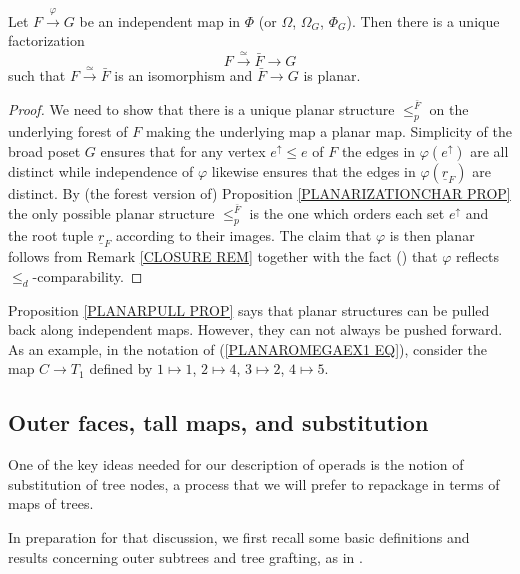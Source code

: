 \documentclass[a4paper,10pt]{article}%
\begin{document}
\begin{proposition}
\label{PLANARPULL PROP}
	Let $F \xrightarrow{\varphi} G$ be an independent map in $\Phi$ (or $\Omega$, $\Omega_G$, $\Phi_G$). Then there is a unique factorization 
	\[F \xrightarrow{\simeq} \bar{F} \to G\]
	such that $F \xrightarrow{\simeq} \bar{F}$ is an isomorphism and $\bar{F} \to G$ is planar.
\end{proposition}

\begin{proof}
We need to show that there is a unique planar structure 
$\leq_p^{\bar{F}}$ on the underlying forest of $F$ making the underlying map a planar map.
Simplicity of the broad poset $G$ ensures that for any vertex $e^{\uparrow} \leq e$ of $F$ the edges in $\varphi(e^{\uparrow})$ are all distinct while independence of $\varphi$ likewise ensures that the edges in $\varphi(\underline{r}_F)$ are distinct.
By (the forest version of) Proposition
\ref{PLANARIZATIONCHAR PROP}
the only possible planar structure $\leq_p^{\bar{F}}$
is the one which orders each set $e^{\uparrow}$ and the root tuple $\underline{r}_F$ according to their images.
The claim that $\varphi$ is then planar follows from 
Remark \ref{CLOSURE REM}
together with the fact (\cite[Lemma 5.33]{Pe17})
that $\varphi$ reflects $\leq_d$-comparability.
\end{proof}


\begin{remark}\label{PULLPLANAR REM}
	Proposition \ref{PLANARPULL PROP} says that planar structures  can be pulled back along independent maps. However, they can not always be pushed forward. As an example, in the notation of (\ref{PLANAROMEGAEX1 EQ}), consider the map $C \to T_1$ defined by $1 \mapsto 1$, $2 \mapsto 4$, $3 \mapsto 2$, $4 \mapsto 5$.
\end{remark}



\subsection{Outer faces, tall maps, and substitution}\label{OUTTALL SEC}
\label{SUBS SEC}

One of the key ideas needed for our description of operads is 
the notion of substitution of tree nodes,
a process that we will prefer to repackage in terms of maps of trees.

In preparation for that discussion,
we first recall some basic definitions and results concerning outer subtrees and tree grafting, as in \cite[\S 5]{Pe17}.
\end{document}
